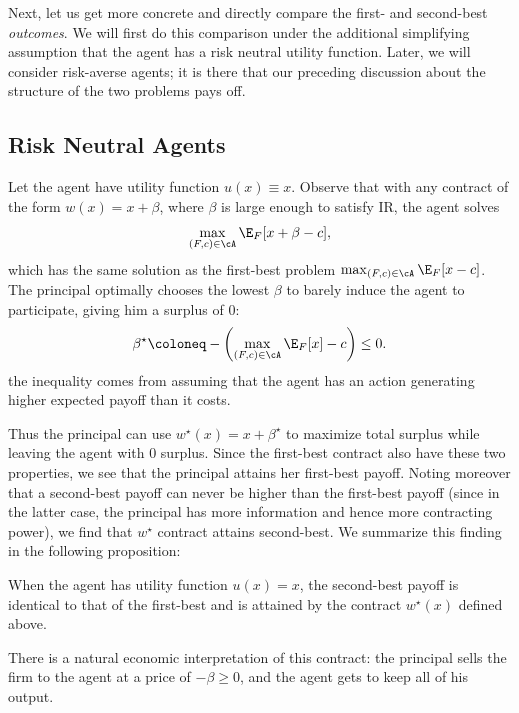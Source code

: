 Next, let us get more concrete and directly compare the first- and second-best \emph{outcomes}.
We will first do this comparison under the additional simplifying assumption that the agent has a risk neutral utility function.
Later, we will consider risk-averse agents; it is there that our preceding discussion about the structure of the two problems pays off.


\subsection{Risk Neutral Agents}
Let the agent have utility function \(u(x) \equiv x\).
Observe that with any contract of the form \(w(x) = x + \beta\), where \(\beta\) is large enough to satisfy IR, the agent solves
\[
  \max_{(F, c) \in \cA} \E_F[x + \beta - c],
\]
which has the same solution as the first-best problem \(\max_{(F, c) \in \cA} \E_F[x - c]\).
The principal optimally chooses the lowest \(\beta\) to barely induce the agent to participate, giving him a surplus of \(0\):
\[
  \beta^\star \coloneq -\left(\max_{(F, c) \in \cA} \E_F[x] - c \right) \leq 0.
\]
the inequality comes from assuming that the agent has an action generating higher expected payoff than it costs.

Thus the principal can use \(w^\star(x) = x + \beta^\star\) to maximize total surplus while leaving the agent with \(0\) surplus.
Since the first-best contract also have these two properties, we see that the principal attains her first-best payoff.
Noting moreover that a second-best payoff can never be higher than the first-best payoff (since in the latter case, the principal has more information and hence more contracting power), we find that \(w^\star\) contract attains second-best.
We summarize this finding in the following proposition:

\begin{proposition}
  When the agent has utility function \(u(x) = x\), the second-best payoff is identical to that of the first-best and is attained by the contract \(w^\star(x)\) defined above.
\end{proposition}

There is a natural economic interpretation of this contract: the principal sells the firm to the agent at a price of \(-\beta \geq 0\), and the agent gets to keep all of his output.



